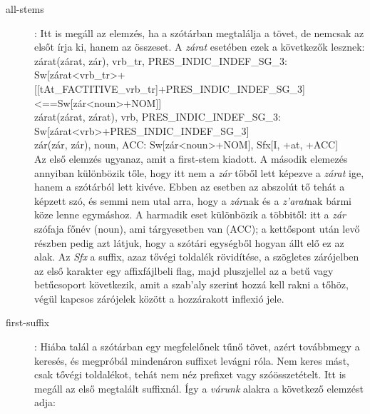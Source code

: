 \documentclass{article}
\begin{document}
\begin{description}
\item[all-stems]: Itt is meg\'all az elemz\'es, ha a sz\'ot\'arban megtal\'alja a t\"ovet, de nemcsak az els\H{o}t \'{i}rja ki, hanem az \"osszeset. A \emph{z\'arat} eset\'eben ezek a k\"ovetkez\H{o}k lesznek: \\

z\'arat(z\'arat, z\'ar), vrb\_tr, PRES\_INDIC\_INDEF\_SG\_3: Sw[z\'arat<vrb\_tr>+[[tAt\_FACTITIVE\_vrb\_tr]+{PRES\_INDIC\_INDEF\_SG\_3}]<==Sw[z\'ar<noun>+{NOM}]] \\

z\'arat(z\'arat, z\'arat), vrb, PRES\_INDIC\_INDEF\_SG\_3: Sw[z\'arat<vrb>+{PRES\_INDIC\_INDEF\_SG\_3}] \\

z\'ar(z\'ar, z\'ar), noun, ACC: Sw[z\'ar<noun>+{NOM}], Sfx[I, +at, +{ACC}] \\

Az els\H{o} elemz\'es ugyanaz, amit a first-stem kiadott. A m\'asodik elemez\'es annyiban k\"ul\"onb\"ozik t\H{o}le, hogy itt nem a \textit{z\'ar} t\H{o}b\H{o}l lett k\'epezve a \textit{z\'arat} ige, hanem a sz\'ot\'arb\'ol lett kiv\'eve. Ebben az esetben az abszol\'ut t\H{o} teh\'at a k\'epzett sz\'o, \'es semmi nem utal arra, hogy a \textit{z\'ar}nak \'es a \textit{z'arat}nak b\'armi k\"oze lenne egym\'ashoz.
A harmadik eset k\"ul\"onb\"ozik a t\"obbit\H{o}l: itt a \textit{z\'ar} sz\'ofaja f\H{o}n\'ev (noun), ami t\'argyesetben van (ACC); a kett\H{o}spont ut\'an lev\H{o} r\'eszben pedig azt l\'atjuk, hogy a sz\'ot\'ari egys\'egb\H{o}l hogyan \'allt el\H{o} ez az alak. Az \textit{Sfx} a suffix, azaz t\H{o}v\'egi toldal\'ek r\"ovid\'{i}t\'ese, a sz\"ogletes z\'ar\'ojelben az els\H{o} karakter egy affixf\'ajlbeli flag, majd pluszjellel az a bet\H{u} vagy bet\H{u}csoport k\"ovetkezik, amit a szab'aly szerint hozz\'a kell rakni a t\H{o}h\"oz, v\'eg\"ul kapcsos z\'ar\'ojelek k\"oz\"ott a hozz\'arakott inflexi\'o jele. \par

\item[first-suffix]: Hi\'aba tal\'al a sz\'ot\'arban egy megfelel\H{o}nek t\H{u}n\H{o} t\"ovet, az\'ert tov\'abbmegy a keres\'es, \'es megpr\'ob\'al minden\'aron suffixet lev\'agni r\'ola. Nem keres m\'ast, csak t\H{o}v\'egi toldal\'ekot, teh\'at nem n\'ez prefixet vagy sz\'o\"osszet\'etelt. Itt is meg\'all az els\H{o} megtal\'alt suffixn\'al. \'{I}gy a \textit{v\'arunk} alakra a k\"ovetkez\H{o} elemz\'est adja: \\


\end{description}
\end{document}
